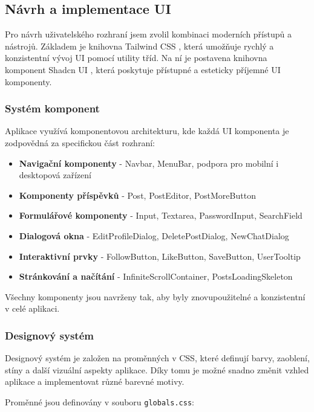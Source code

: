 \documentclass[12pt]{article}
\begin{document}
\subsection{Návrh a implementace UI}

Pro návrh uživatelského rozhraní jsem zvolil kombinaci moderních přístupů a nástrojů. Základem je knihovna Tailwind CSS \citep{TailwindCSS}, která umožňuje rychlý a konzistentní vývoj UI pomocí utility tříd. Na ní je postavena knihovna komponent Shadcn UI \citep{Shadcn}, která poskytuje přístupné a esteticky příjemné UI komponenty.

\subsubsection{Systém komponent}

Aplikace využívá komponentovou architekturu, kde každá UI komponenta je zodpovědná za specifickou část rozhraní:

\begin{itemize}
    \item \textbf{Navigační komponenty} - Navbar, MenuBar, podpora pro mobilní i desktopová zařízení
    \item \textbf{Komponenty příspěvků} - Post, PostEditor, PostMoreButton
    \item \textbf{Formulářové komponenty} - Input, Textarea, PasswordInput, SearchField
    \item \textbf{Dialogová okna} - EditProfileDialog, DeletePostDialog, NewChatDialog
    \item \textbf{Interaktivní prvky} - FollowButton, LikeButton, SaveButton, UserTooltip
    \item \textbf{Stránkování a načítání} - InfiniteScrollContainer, PostsLoadingSkeleton
\end{itemize}

Všechny komponenty jsou navrženy tak, aby byly znovupoužitelné a konzistentní v celé aplikaci.

\newpage
\subsubsection{Designový systém}

Designový systém je založen na proměnných v CSS, které definují barvy, zaoblení, stíny a další vizuální aspekty aplikace. Díky tomu je možné snadno změnit vzhled aplikace a implementovat různé barevné motivy.

Proměnné jsou definovány v souboru \texttt{globals.css}:
\end{document}
